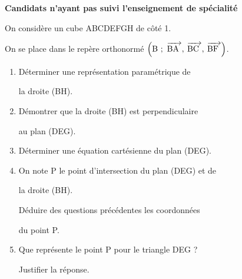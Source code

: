 \documentclass[12pt,a4paper,french]{article}
\newcommand{\vect}[1]{\mathchoice%
{\overrightarrow{\displaystyle\mathstrut#1\,\,}}%
{\overrightarrow{\textstyle\mathstrut#1\,\,}}%
{\overrightarrow{\scriptstyle\mathstrut#1\,\,}}%
{\overrightarrow{\scriptscriptstyle\mathstrut#1\,\,}}}
\newcommand{\brm}[1]{\marginpar{\addpoints{#1}}}%
\begin{document}
\begin{question}
\vspace{-5.8mm}
\begin{flushright}\hfill\textbf{Candidats n'ayant pas suivi l'enseignement de spécialité}\hfill ~\end{flushright}

On considère un cube ABCDEFGH de côté 1.


On se place dans le repère orthonormé $\left(\text{B}~;~\vect{\text{BA}},\: \vect{\text{BC}},\: \vect{\text{BF}}\right)$.

\medskip

\begin{enumerate}
\item Déterminer une représentation paramétrique de

la droite (BH). \brm{1}
\item Démontrer que la droite (BH) est perpendiculaire

au plan (DEG). \brm{1.0}
\item Déterminer une équation cartésienne du plan (DEG). \brm{1}
\item On note P le point d'intersection du plan (DEG) et de 

la droite (BH).

Déduire des questions précédentes les coordonnées

du point P. \brm{1.0}

\item Que représente le point P pour le triangle DEG ?

Justifier la réponse. \brm{1.0}
\end{enumerate}

\end{question}
\end{document}
